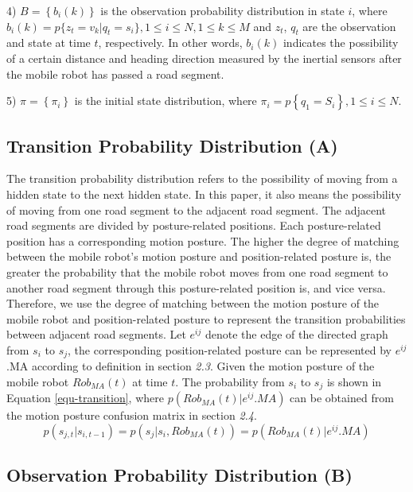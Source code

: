 \documentclass{llncs}
\begin{document}
4) $B = \left\{ {{b_i}(k)} \right\}$ is the observation probability distribution in state $i$, where ${b_i}(k) = p\{ {z_t} = {v_k}|{q_t} = {s_i}\},1 \le i \le N,1 \le k \le M$ and $z_t$, $q_t$ are the observation and state at time $t$, respectively. In other words, ${b_i}(k)$ indicates the possibility of a certain distance and heading direction measured by the inertial sensors after the mobile robot has passed a road segment.

5) $\pi  = \left\{ {{\pi _i}} \right\}$ is the initial state distribution, where ${\pi _i} = p\left\{ {{q_1} = {S_i}} \right\},1 \le i \le N$.

\subsection{Transition Probability Distribution (A)}

The transition probability distribution refers to the possibility of moving from a hidden state to the next hidden state. In this paper, it also means the possibility of moving from one road segment to the adjacent road segment. The adjacent road segments are divided by posture-related positions. Each posture-related position has a corresponding motion posture. The higher the degree of matching between the mobile robot's motion posture and position-related posture is, the greater the probability that the mobile robot moves from one road segment to another road segment through this posture-related position is, and vice versa. Therefore, we use the degree of matching between the motion posture of the mobile robot and position-related posture to represent the transition probabilities between adjacent road segments. Let $e^{ij}$ denote the edge of the directed graph from $s_i$ to $s_j$, the corresponding position-related posture can be represented by $e^{ij}$.MA according to definition in section \emph{2.3}. Given the motion posture of the mobile robot $Rob_{MA}(t)$ at time $t$. The probability from $s_i$ to $s_j$ is shown in Equation \ref{equ-transition}, where $p(Ro{b_{MA}}(t)|{e^{ij}}.MA)$ can be obtained from the motion posture confusion matrix in section \emph{2.4}.
\begin{equation}
     \label{equ-transition}
	p({s_{j,t}}|{s_{i,t - 1}}) = p({s_j}|{s_i},Ro{b_{MA}}(t)) = p(Ro{b_{MA}}(t)|{e^{ij}}.MA)
\end{equation}

\subsection{Observation Probability Distribution (B)}
\end{document}
